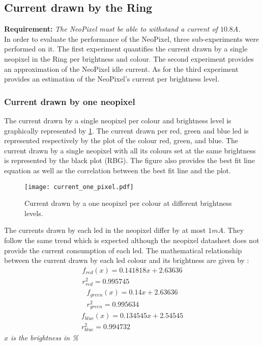 \subsection{Current drawn by the Ring}
\textbf{Requirement:}  \textit{The NeoPixel must be able to withstand a current of $10.8A$.}\\
In order to evaluate the performance of the NeoPixel, three sub-experiments were performed on it. The first experiment quantifies the current drawn by a single neopixel in the Ring per brightness and colour. The second experiment provides an approximation of the NeoPixel idle current. As for the third experiment provides an estimation of the NeoPixel's current per brightness level.

\subsubsection{Current drawn by one neopixel} \label{current_one}
The current drawn by a single neopixel per colour and brightness level is graphically represented by \cref{fig:current_one_pixel}. The current drawn per red, green and blue led is represented respectively by the plot of the colour red, green, and blue. The current drawn by a single neopixel with all its colours set at the same brightness is represented by the black plot (RBG). The figure also provides the best fit line equation as well as the correlation between the best fit line and the plot.  
\begin{figure}[ht]
	\centering
	\texttt{[image: current\_one\_pixel.pdf]}
	\caption{Current drawn by a one neopixel per colour at different brightness levels.}
	\label{fig:current_one_pixel}
\end{figure}
The currents drawn by each led in the neopixel differ by at most $1mA$. They follow the same trend which is expected although the neopixel datasheet does not provide the current consumption of each led. The mathematical relationship between the current drawn by each led colour and its brightness are given by :
\begin{equation}
\label{eq:f_red}
\begin{multlined}
f_{red}(x) = 0.141818x+2.63636 \\
r^2_{red} = 0.995745
\end{multlined}
\end{equation} 
\begin{equation}
\label{eq:f_green}
\begin{multlined}
f_{green}(x) = 0.14x+2.63636 \\
r^2_{green} = 0.995634
\end{multlined}
\end{equation} 
\begin{equation}
\label{eq:f_blue}
\begin{multlined}
f_{blue}(x) = 0.134545x+2.54545 \\
r^2_{blue} = 0.994732
\end{multlined}
\end{equation} 
{
	\centering
	\textit{$x$ is the brightness in \%}\\
}

